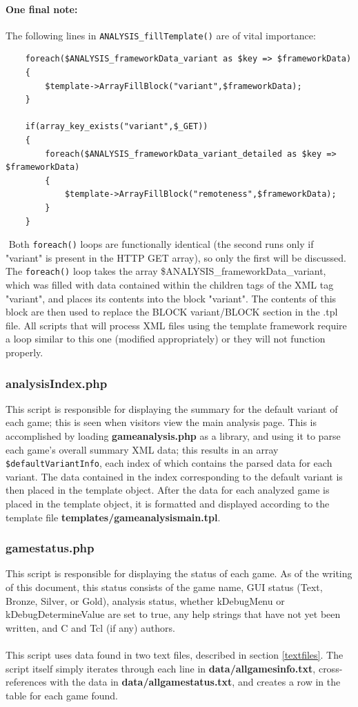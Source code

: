 \documentclass[11pt]{article}
\newcommand{\gcref}[1]{\textcolor{cyan}{\underline{\ref{#1}}}}
\begin{document}
\paragraph{One final note:}
The following lines in \texttt{ANALYSIS\_fillTemplate()} are of vital importance:
\begin{verbatim}
	foreach($ANALYSIS_frameworkData_variant as $key => $frameworkData)
	{
		$template->ArrayFillBlock("variant",$frameworkData);		
	}
	
	if(array_key_exists("variant",$_GET))
	{
		foreach($ANALYSIS_frameworkData_variant_detailed as $key => $frameworkData)
		{
			$template->ArrayFillBlock("remoteness",$frameworkData);		
		}
	}
\end{verbatim} $ $ %
Both \texttt{foreach()} loops are functionally identical (the second runs only if "variant" is present in the HTTP GET array), so only the first will be discussed. The \texttt{foreach()} loop takes the array \$ANALYSIS\_frameworkData\_variant, which was filled with data contained within the children tags of the XML tag "variant", and places its contents into the block "variant". The contents of this block are then used to replace the {BLOCK variant}{/BLOCK} section in the .tpl file. All scripts that will process XML files using the template framework require a loop similar to this one (modified appropriately) or they will not function properly.
\subsubsection{analysisIndex.php}
This script is responsible for displaying the summary for the default variant of each game; this is seen when visitors view the main analysis page. This is accomplished by loading \textbf{gameanalysis.php} as a library, and using it to parse each game's overall summary XML data; this results in an array \texttt{\$defaultVariantInfo}, each index of which contains the parsed data for each variant. The data contained in the index corresponding to the default variant is then placed in the template object. After the data for each analyzed game is placed in the template object, it is formatted and displayed according to the template file \textbf{templates/gameanalysismain.tpl}.
\subsubsection{gamestatus.php}
This script is responsible for displaying the status of each game. As of the writing of this document, this status consists of the game name, GUI status (Text, Bronze, Silver, or Gold), analysis status, whether kDebugMenu or kDebugDetermineValue are set to true, any help strings that have not yet been written, and C and Tcl (if any) authors.\\\\
This script uses data found in two text files, described in section \gcref{textfiles}. The script itself simply iterates through each line in \textbf{data/allgamesinfo.txt}, cross-references with the data in \textbf{data/allgamestatus.txt}, and creates a row in the table for each game found.
\end{document}
